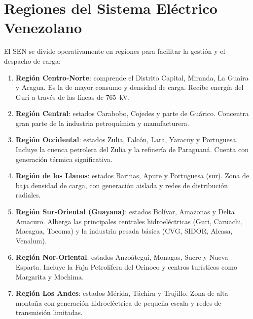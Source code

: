 \documentclass[12pt,a4paper]{article}
\begin{document}
\section{Regiones del Sistema Eléctrico Venezolano}

El SEN se divide operativamente en regiones para facilitar la gestión y
el despacho de carga:

\begin{enumerate}[nosep]
    \item \textbf{Región Centro-Norte}: comprende el Distrito Capital,
          Miranda, La Guaira y Aragua. Es la de mayor consumo y
          densidad de carga. Recibe energía del Guri a través de las
          líneas de \SI{765}{\kilo\volt}.
    \item \textbf{Región Central}: estados Carabobo, Cojedes y parte de
          Guárico. Concentra gran parte de la industria petroquímica y
          manufacturera.
    \item \textbf{Región Occidental}: estados Zulia, Falcón, Lara,
          Yaracuy y Portuguesa. Incluye la cuenca petrolera del Zulia y
          la refinería de Paraguaná. Cuenta con generación térmica
          significativa.
    \item \textbf{Región de los Llanos}: estados Barinas, Apure y
          Portuguesa (sur). Zona de baja densidad de carga, con
          generación aislada y redes de distribución radiales.
    \item \textbf{Región Sur-Oriental (Guayana)}: estados Bolívar,
          Amazonas y Delta Amacuro. Alberga las principales centrales
          hidroeléctricas (Guri, Caruachi, Macagua, Tocoma) y la
          industria pesada básica (CVG, SIDOR, Alcasa, Venalum).
    \item \textbf{Región Nor-Oriental}: estados Anzoátegui, Monagas,
          Sucre y Nueva Esparta. Incluye la Faja Petrolífera del Orinoco
          y centros turísticos como Margarita y Mochima.
    \item \textbf{Región Los Andes}: estados Mérida, Táchira y Trujillo.
          Zona de alta montaña con generación hidroeléctrica de pequeña
          escala y redes de transmisión limitadas.
\end{enumerate}
\end{document}
